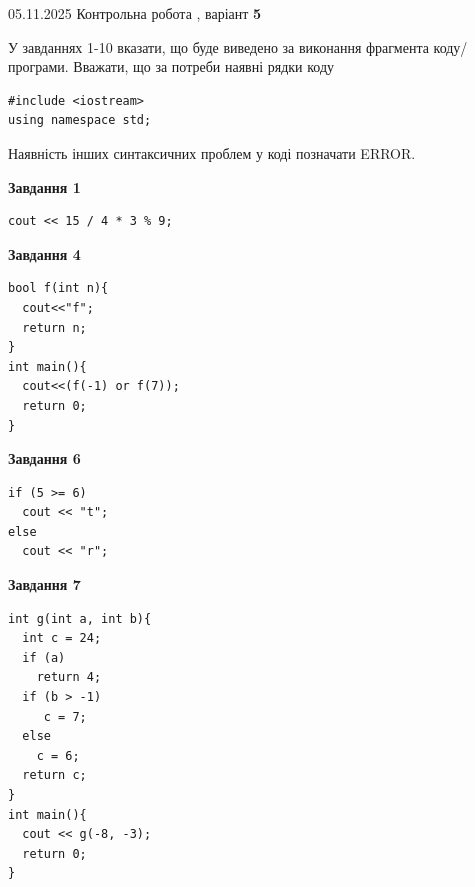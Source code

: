 \documentclass[12pt, ukrainian]{article}
\begin{document}
{\Large{05.11.2025 Контрольна робота , варіант  \No \textbf { 5 }\par}}
{
\begin {large}
У завданнях 1-10 вказати, що буде виведено за виконання фрагмента коду/про\-гра\-ми.
Вважати, що за потреби наявні рядки коду
\begin{verbatim}
#include <iostream>
using namespace std;
\end{verbatim}
Наявність інших синтаксичних проблем у коді позначати ERROR.

\begin{minipage}[t]{7.0cm}

\begin{center}
\textbf{Завдання 1}
\end{center}
\vspace{-8mm}

\begin{verbatim}
cout << 15 / 4 * 3 % 9;
\end{verbatim}



\begin{center}
\textbf{Завдання 4}
\end{center}
\vspace{-8mm}

\begin{verbatim}
bool f(int n){
  cout<<"f";
  return n;
}
int main(){
  cout<<(f(-1) or f(7));
  return 0;
}
\end{verbatim}



\begin{center}
\textbf{Завдання 6}
\end{center}
\vspace{-8mm}

\begin{verbatim}
if (5 >= 6)
  cout << "t";
else
  cout << "r";
\end{verbatim}



\begin{center}
\textbf{Завдання 7}
\end{center}
\vspace{-8mm}

\begin{verbatim}
int g(int a, int b){
  int c = 24;
  if (a)
    return 4;
  if (b > -1)
     c = 7;
  else
    c = 6;
  return c;
}
int main(){
  cout << g(-8, -3);
  return 0;
}
\end{verbatim}


\end{minipage}
\end{large}}
\end{document}
